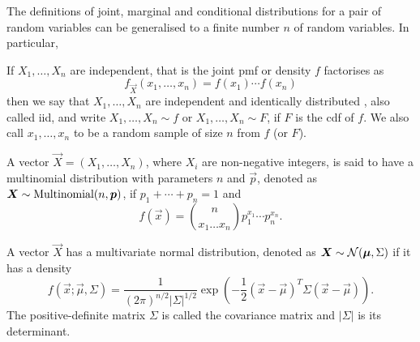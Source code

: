 \documentclass{article}
\begin{document}
The definitions of joint, marginal and conditional distributions for a pair of
random variables can be generalised to a finite number $n$ of random variables.
In particular,
\begin{defn}\label{c2d18}
If $X_1, \ldots, X_n$ are independent, that is the joint pmf or density $f$ 
factorises as
\[
f_{\vec{X}}(x_1, \ldots, x_n) = f(x_1)\cdots f(x_n)
\]
then we say that $X_1, \ldots, X_n$ are independent and identically distributed
, also called iid, and write $X_1, \ldots, X_n \sim f$ or $X_1, \ldots, X_n \sim
F$, if $F$ is the cdf of $f$. We also call $x_1, \ldots, x_n$ to be a random 
sample of size $n$ from $f$ (or $F$).
\end{defn}

\begin{defn}\label{c2d19}
A vector $\vec{X} = (X_1, \ldots, X_n)$, where $X_i$ are non-negative integers,
is said to have a multinomial distribution with parameters $n$ and $\vec{p}$,
denoted as $\bm{X} \sim \text{Multinomial}(n, \bm{p})$, if $p_1 + \cdots + p_n = 1$ and 
\begin{equation}\label{c2e25}
f(\vec{x}) = \binom{n}{x_1 \ldots x_n}p_1^{x_1}\cdots p_n^{x_n}.
\end{equation}
\end{defn}

\begin{defn}\label{c2d20}
A vector $\vec{X}$ has a multivariate normal distribution, denoted as $\bm{X}
\sim \mathcal{N}(\bm{\mu}, \Sigma)$ if it has a density
\begin{equation}\label{c2e26}
f(\vec{x}; \vec{\mu}, \Sigma) = \frac{1}{(2\pi)^{n/2}|\Sigma|^{1/2}}
\exp\left(-\frac{1}{2}(\vec{x} - \vec{\mu})^T\Sigma(\vec{x} - \vec{\mu})\right).
\end{equation}
The positive-definite matrix $\Sigma$ is called the covariance matrix and 
$|\Sigma|$ is its determinant.
\end{defn}
\end{document}

